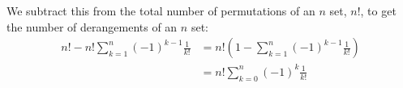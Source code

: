 \documentclass[11pt]{scrartcl}
\begin{document}
We subtract this from the total number of permutations of an $n$ set, $n!$, to get the number of derangements of an $n$ set: 
\begin{align*}
    n!-n!\sum_{k=1}^{n} (-1)^{k-1}\frac{1}{k!} &= n!(1-\sum_{k=1}^{n} (-1)^{k-1}\frac{1}{k!}) \\
                                               &= n!\sum_{k=0}^{n}(-1)^{k}\frac{1}{k!}
\end{align*}
\end{document}
